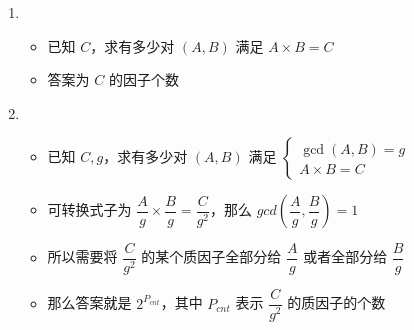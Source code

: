 \documentclass[E:/GsjzTle/main/main.tex]{subfiles}
\begin{document}
\begin{enumerate}
\def\labelenumi{\arabic{enumi}.}
\item
  \begin{itemize}
  \item
    已知 \(C\)，求有多少对 \((A,B)\) 满足 \(A \times B = C\)
  \item
    答案为 \(C\) 的因子个数
  \end{itemize}
\item
  \begin{itemize}
  \item
    已知 \(C,g\)，求有多少对 \((A,B)\) 满足
    \(\begin{cases}\gcd \left( A,B\right) =g\\
    A\times B=C\end{cases}\)
  \item
    可转换式子为
    \(\dfrac{A}{g} \times \dfrac{B}{g} = \dfrac{C}{g^2}\)，那么
    \(gcd(\dfrac{A}{g},\dfrac{B}{g}) = 1\)
  \item
    所以需要将 \(\dfrac{C}{g^2}\) 的某个质因子全部分给 \(\dfrac{A}{g}\)
    或者全部分给 \(\dfrac{B}{g}\)
  \item
    那么答案就是 \(2^{P_{cnt}}\)，其中 \(P_{cnt}\) 表示
    \(\dfrac{C}{g^2}\) 的质因子的个数
  \end{itemize}
\end{enumerate}
\end{document}
